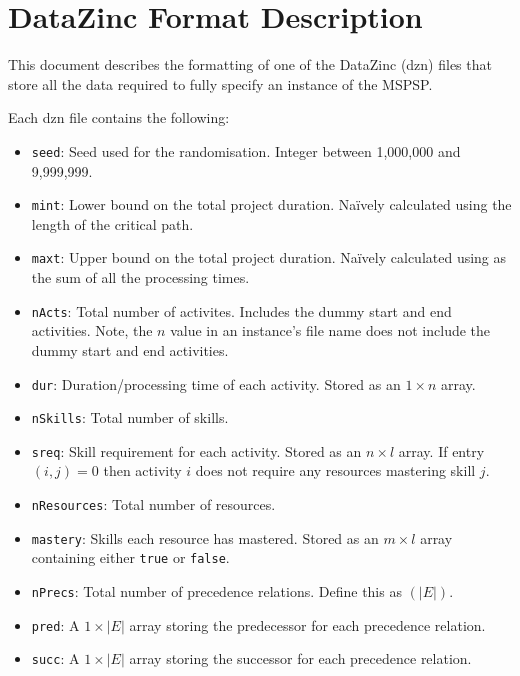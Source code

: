 \documentclass[12pt]{article}
\begin{document}
\section{DataZinc Format Description}

This document describes the formatting of one of the DataZinc (dzn) files
that store all the data required to fully specify an instance of
the MSPSP.

Each dzn file contains the following:
\begin{itemize}
    \item {\tt seed}: Seed used for the randomisation. Integer between 1,000,000 and 9,999,999.
    \item {\tt mint}: Lower bound on the total project duration. Na\"{i}vely calculated using 
        the length of the critical path.
    \item {\tt maxt}: Upper bound on the total project duration. Na\"{i}vely calculated using
        as the sum of all the processing times.
    \item {\tt nActs}: Total number of activites. Includes the dummy start and end activities.
        Note, the $n$ value in an instance's file name does not include the dummy start and end activities.
    \item {\tt dur}: Duration/processing time of each activity. Stored as an $1\times n$ array.
    \item {\tt nSkills}: Total number of skills.
    \item {\tt sreq}: Skill requirement for each activity. Stored as an $n\times l$ array. If entry
    $(i,j)=0$ then activity $i$ does not require any resources mastering skill $j$.
    \item {\tt nResources}: Total number of resources.
    \item {\tt mastery}: Skills each resource has mastered. Stored as an $m\times l$ array containing
    either {\tt true} or {\tt false}.
    \item {\tt nPrecs}: Total number of precedence relations. Define this as $(|E|)$.
    \item {\tt pred}: A $1\times |E|$ array storing the predecessor for each precedence relation.
    \item {\tt succ}: A $1\times |E|$ array storing the successor for each precedence relation.
\end{itemize}
\end{document}
